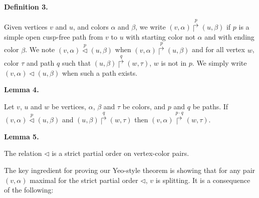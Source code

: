  
 
\par\medskip\noindent\textbf{Definition 3.}\par
 
 
Given vertices $v$ and $u$, and colors $\alpha$ and $\beta$, we write $(v,\alpha)\overset{p}{\Rsh}(u,\beta)$ if $p$ is a simple open cusp-free path from $v$ to $u$ with starting color not $\alpha$ and with ending color $\beta$. We note $(v,\alpha)\overset{p}{\lhd}(u,\beta)$ when $(v,\alpha)\overset{p}{\Rsh}(u,\beta)$ and for all vertex $w$, color $\tau$ and path $q$ such that $(u,\beta)\overset{q}{\Rsh}(w,\tau)$, $w$ is not in $p$. We simply write $(v,\alpha)\lhd(u,\beta)$ when such a path exists.\par
 
 
 
 
\par\medskip\noindent\textbf{Lemma 4.}\par
 
 
Let $v$, $u$ and $w$ be vertices, $\alpha$, $\beta$ and $\tau$ be colors, and $p$ and $q$ be paths. If $(v,\alpha)\overset{p}{\lhd}(u,\beta)$ and $(u,\beta)\overset{q}{\Rsh}(w,\tau)$ then $(v,\alpha)\overset{p\cdot q}{\Rsh}(w,\tau)$.\par
 
 
 
 
\par\medskip\noindent\textbf{Lemma 5.}\par
 
 
The relation $\lhd$ is a strict partial order on vertex-color pairs.\par
 
 
 
 
The key ingredient for proving our Yeo-style theorem is showing that for any pair $(v,\alpha)$ maximal for the strict partial order $\lhd$, $v$ is splitting. It is a consequence of the following:\par
 
